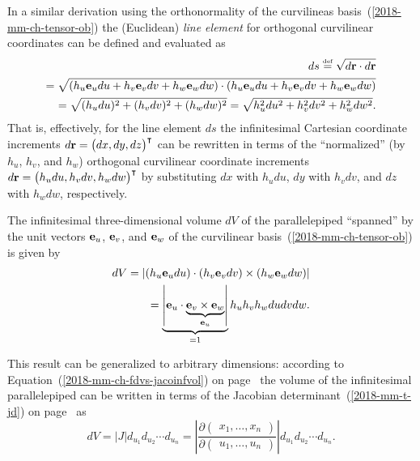 In a similar derivation using the orthonormality of the curvilineas basis~(\ref{2018-mm-ch-tensor-ob})
the
(Euclidean) {\em line element }
for orthogonal curvilinear coordinates
can be defined and evaluated as
\begin{equation}
\begin{split}
ds \stackrel{{\text{\tiny def}}}{=}
\sqrt{d {\bf r} \cdot d {\bf r}}
\\ =
\sqrt{
\left(
{ h_u }{\bf e}_u   du + { h_v }{\bf e}_v   dv + { h_w } {\bf e}_w dw
\right)
\cdot
\left(
{ h_u }{\bf e}_u   du + { h_v }{\bf e}_v   dv + { h_w } {\bf e}_w dw
\right)
}
\\ =
\sqrt{
(h_u du)^2 + (h_v dv)^2 + (h_w dw)^2
}
=
\sqrt{
h_u^2 du^2 + h_v^2 dv^2 + h_w^2 dw^2
}
.
\end{split}
\label{2018-mm-ch-tensor-le}
\end{equation}
That is, effectively, for the line element $ds$ the infinitesimal Cartesian coordinate increments
$
d {\bf r}=
\begin{pmatrix}
dx, dy, dz
\end{pmatrix}^\intercal
$
can be rewritten in terms of the ``normalized'' (by $h_u$, $h_v$, and $h_w$)
orthogonal curvilinear coordinate increments
$
d {\bf r}=
\begin{pmatrix}
h_u  du , h_v dv, h_w dw
\end{pmatrix}^\intercal
$
by substituting
$dx$ with $h_u  du$,
$dy$ with $h_v  dv$, and
$dz$ with $h_w  dw$, respectively.



The infinitesimal three-dimensional volume $dV$ of the parallelepiped ``spanned'' by the
unit vectors
${\bf e}_{u}$, ${\bf e}_{v}$, and ${\bf e}_{w}$
of the
curvilinear basis~(\ref{2018-mm-ch-tensor-ob})
is given by
\begin{equation}
\begin{split}
dV =
\left|
(h_u {\bf e}_u du) \cdot
(h_v {\bf e}_v dv) \times
(h_w {\bf e}_w dw)
\right|
\\ =
\underbrace{\left| {\bf e}_u \cdot  {\underbrace{{\bf e}_v \times {\bf e}_w}_{{\bf e}_u}} \right|}_{=1}
h_u h_v h_w  du dv dw
.
\end{split}
\label{2018-mm-ch-tensor-veoclc}
\end{equation}

This result can be generalized to arbitrary dimensions:
according to Equation~(\ref{2018-mm-ch-fdvs-jacoinfvol})
on page~\pageref{2018-mm-ch-fdvs-jacoinfvol}
the volume of the infinitesimal parallelepiped
can be written in terms  of the Jacobian determinant~(\ref{2018-mm-t-jd}) on page~\pageref{2018-mm-t-jd}
as
\begin{equation}
dV =
\left| J \right|
d_{u_1} d_{u_2} \cdots d_{u_n}
 =
\left|
\frac{
\partial \begin{pmatrix}x_1, \ldots , x_n \end{pmatrix}
}
{
\partial \begin{pmatrix} u_1, \ldots , u_n \end{pmatrix}
}
\right|
d_{u_1} d_{u_2} \cdots d_{u_n}
.
\label{2018-mm-ch-tensor-veoclcjd}
\end{equation}


